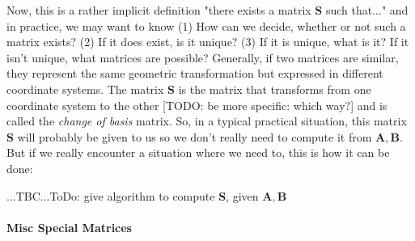 \medskip
Now, this is a rather implicit definition "there exists a matrix $\mathbf{S}$ such that..." and in practice, we may want to know (1) How can we decide, whether or not such a matrix exists? (2) If it does exist, is it unique? (3) If it is unique, what is it? If it isn't unique, what matrices are possible? Generally, if two matrices are similar, they represent the same geometric transformation but expressed in different coordinate systems. The matrix $\mathbf{S}$ is the matrix that transforms from one coordinate system to the other [TODO: be more specific: which way?] and is called the \emph{change of basis} matrix. So, in a typical practical situation, this matrix $\mathbf{S}$ will probably be given to us so we don't really need to compute it from $\mathbf{A,B}$. But if we really encounter a situation where we need to, this is how it can be done:

...TBC...ToDo: give algorithm to compute $\mathbf{S}$, given $\mathbf{A,B}$









\paragraph{Misc Special Matrices}



